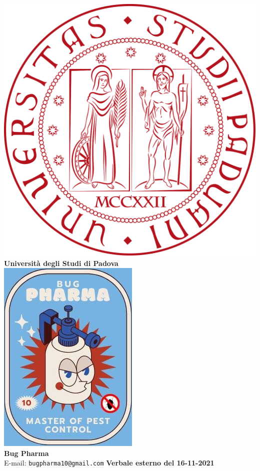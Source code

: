 \documentclass[11pt]{article}
\begin{document}
	\thispagestyle{empty}
	\begin{titlepage}
		\begin{center}
			\includegraphics[scale = 0.05]{../logo_unipd.png}\\
			\large \textbf{Università degli Studi di Padova} \\
			\vfill
			\includegraphics[scale = 0.7]{../logo_small.jpg}\\
			\large \textbf{Bug Pharma} \\
			\vfill
			\large
			E-mail: 
			\texttt{bugpharma10@gmail.com}
			\vfill
			\Huge \textbf{Verbale esterno del 16-11-2021}\\
			

\end{center}
\end{titlepage}
\end{document}
